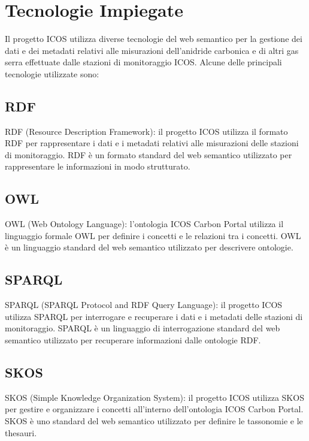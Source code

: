 \chapter{Tecnologie Impiegate}
\label{chap:tecnologie}

Il progetto ICOS utilizza diverse tecnologie del web semantico per la gestione dei dati e dei metadati relativi alle misurazioni dell'anidride carbonica e di altri gas serra effettuate dalle stazioni di monitoraggio ICOS. Alcune delle principali tecnologie utilizzate sono:

\section{RDF}
\label{section:rdf}
RDF (Resource Description Framework): il progetto ICOS utilizza il formato RDF per rappresentare i dati e i metadati relativi alle misurazioni delle stazioni di monitoraggio. RDF è un formato standard del web semantico utilizzato per rappresentare le informazioni in modo strutturato.

\section{OWL}
\label{section:owl}
OWL (Web Ontology Language): l'ontologia ICOS Carbon Portal utilizza il linguaggio formale OWL per definire i concetti e le relazioni tra i concetti. OWL è un linguaggio standard del web semantico utilizzato per descrivere ontologie.

\section{SPARQL}
\label{section:sparql}
SPARQL (SPARQL Protocol and RDF Query Language): il progetto ICOS utilizza SPARQL per interrogare e recuperare i dati e i metadati delle stazioni di monitoraggio. SPARQL è un linguaggio di interrogazione standard del web semantico utilizzato per recuperare informazioni dalle ontologie RDF.

\section{SKOS}
\label{section:skos}
SKOS (Simple Knowledge Organization System): il progetto ICOS utilizza SKOS per gestire e organizzare i concetti all'interno dell'ontologia ICOS Carbon Portal. SKOS è uno standard del web semantico utilizzato per definire le tassonomie e le thesauri.

